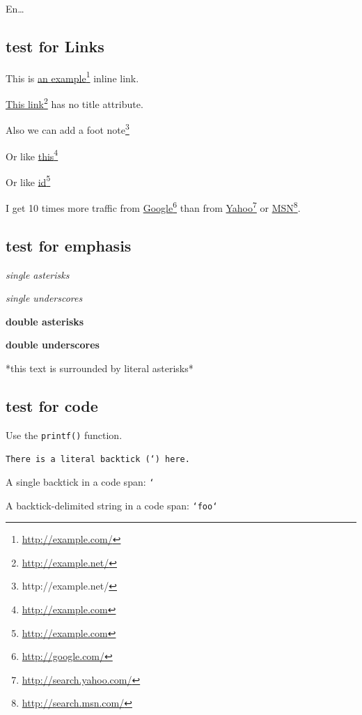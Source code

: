 En{\ldots}

\subsection{test for Links}
\label{testforlinks}

This is \href{http://example.com/}{an example}\footnote{\href{http://example.com/}{http:/\slash example.com\slash }} inline link.

\href{http://example.net/}{This link}\footnote{\href{http://example.net/}{http:/\slash example.net\slash }} has no title attribute.

Also we can add a foot note\footnote{http:\slash \slash example.net\slash }

Or like \href{http://example.com}{this}\footnote{\href{http://example.com}{http:/\slash example.com}}

Or like \href{http://example.com}{id}\footnote{\href{http://example.com}{http:/\slash example.com}}

I get 10 times more traffic from \href{http://google.com/}{Google}\footnote{\href{http://google.com/}{http:/\slash google.com\slash }} than from
\href{http://search.yahoo.com/}{Yahoo}\footnote{\href{http://search.yahoo.com/}{http:/\slash search.yahoo.com\slash }} or \href{http://search.msn.com/}{MSN}\footnote{\href{http://search.msn.com/}{http:/\slash search.msn.com\slash }}.

\subsection{test for emphasis}
\label{testforemphasis}

\emph{single asterisks}

\emph{single underscores}

\textbf{double asterisks}

\textbf{double underscores}

*this text is surrounded by literal asterisks*

\subsection{test for code}
\label{testforcode}

Use the \texttt{printf()} function.

\texttt{There is a literal backtick (`) here.}

A single backtick in a code span: \texttt{`}

A backtick-delimited string in a code span: \texttt{`foo`}

